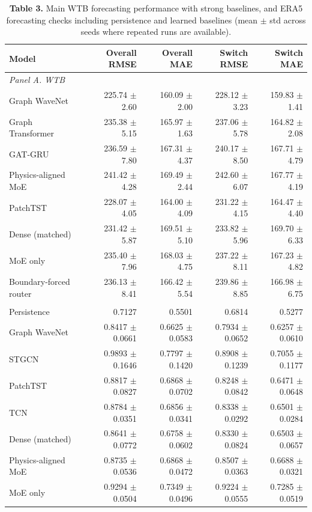 \begin{table}[t]
\centering
\small
\setlength{\tabcolsep}{7pt}
\renewcommand{\arraystretch}{1.08}
\caption*{\textbf{Table 3.} Main WTB forecasting performance with strong baselines, and ERA5 forecasting checks including persistence and learned baselines (mean $\pm$ std across seeds where repeated runs are available).}
\begin{tabular}{lrrrr}
\toprule
Model & Overall RMSE & Overall MAE & Switch RMSE & Switch MAE \\
\midrule
\multicolumn{5}{l}{\textit{Panel A. WTB}} \\
Graph WaveNet & 225.74 $\pm$ 2.60 & 160.09 $\pm$ 2.00 & 228.12 $\pm$ 3.23 & 159.83 $\pm$ 1.41 \\
Graph Transformer & 235.38 $\pm$ 5.15 & 165.97 $\pm$ 1.63 & 237.06 $\pm$ 5.78 & 164.82 $\pm$ 2.08 \\
GAT-GRU & 236.59 $\pm$ 7.80 & 167.31 $\pm$ 4.37 & 240.17 $\pm$ 8.50 & 167.71 $\pm$ 4.79 \\
Physics-aligned MoE & 241.42 $\pm$ 4.28 & 169.49 $\pm$ 2.44 & 242.60 $\pm$ 6.07 & 167.77 $\pm$ 4.19 \\
PatchTST & 228.07 $\pm$ 4.05 & 164.00 $\pm$ 4.09 & 231.22 $\pm$ 4.15 & 164.47 $\pm$ 4.40 \\
Dense (matched) & 231.42 $\pm$ 5.87 & 169.51 $\pm$ 5.10 & 233.82 $\pm$ 5.96 & 169.70 $\pm$ 6.33 \\
MoE only & 235.40 $\pm$ 7.96 & 168.03 $\pm$ 4.75 & 237.22 $\pm$ 8.11 & 167.23 $\pm$ 4.82 \\
Boundary-forced router & 236.13 $\pm$ 8.41 & 166.42 $\pm$ 5.54 & 239.86 $\pm$ 8.85 & 166.98 $\pm$ 6.75 \\
\addlinespace[2pt]
\multicolumn{5}{l}{\textit{Panel B. ERA5}} \\
Persistence & 0.7127 & 0.5501 & 0.6814 & 0.5277 \\
Graph WaveNet & 0.8417 $\pm$ 0.0661 & 0.6625 $\pm$ 0.0583 & 0.7934 $\pm$ 0.0652 & 0.6257 $\pm$ 0.0610 \\
STGCN & 0.9893 $\pm$ 0.1646 & 0.7797 $\pm$ 0.1420 & 0.8908 $\pm$ 0.1239 & 0.7055 $\pm$ 0.1177 \\
PatchTST & 0.8817 $\pm$ 0.0827 & 0.6868 $\pm$ 0.0702 & 0.8248 $\pm$ 0.0842 & 0.6471 $\pm$ 0.0648 \\
TCN & 0.8784 $\pm$ 0.0351 & 0.6856 $\pm$ 0.0341 & 0.8338 $\pm$ 0.0292 & 0.6501 $\pm$ 0.0284 \\
Dense (matched) & 0.8641 $\pm$ 0.0772 & 0.6758 $\pm$ 0.0602 & 0.8330 $\pm$ 0.0824 & 0.6503 $\pm$ 0.0657 \\
Physics-aligned MoE & 0.8735 $\pm$ 0.0536 & 0.6868 $\pm$ 0.0472 & 0.8507 $\pm$ 0.0363 & 0.6688 $\pm$ 0.0321 \\
MoE only & 0.9294 $\pm$ 0.0504 & 0.7349 $\pm$ 0.0496 & 0.9224 $\pm$ 0.0555 & 0.7285 $\pm$ 0.0519 \\
\bottomrule
\end{tabular}
\end{table}

